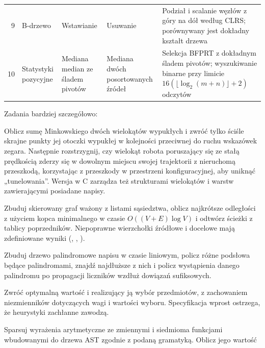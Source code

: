 \begin{table}[htbp]
\begin{tabularx}{\textwidth}{@{}rL{2.7cm}L{3.0cm}L{3.0cm}Y@{}}
    9  & B-drzewo                   & Wstawianie & Usuwanie & Podział i scalanie węzłów z góry na dół według CLRS; porównywany jest dokładny kształt drzewa~\cite{bayer1972btree,cormen2009clrs} \\
    10 & Statystyki pozycyjne       & Mediana median ze śladem pivotów & Mediana dwóch posortowanych źródeł & Selekcja BFPRT z dokładnym śladem pivotów; wyszukiwanie binarne przy limicie $16(\lfloor\log_2(m{+}n)\rfloor+2)$ odczytów~\cite{blum1973time} \\
    \bottomrule
  \end{tabularx}
\end{table}

\noindent Zadania bardziej szczegółowo:

\begin{description}[leftmargin=0pt,itemsep=3pt,font=\normalfont\bfseries]
  \item[Zadanie 1: logika przestrzenna.] Oblicz sumę Minkowskiego dwóch wielokątów wypukłych i zwróć
    tylko ściśle skrajne punkty jej otoczki wypukłej w kolejności przeciwnej do ruchu wskazówek
    zegara. Następnie rozstrzygnij, czy wielokąt robota poruszający się ze stałą prędkością zderzy
    się w dowolnym miejscu swojej trajektorii z nieruchomą przeszkodą, korzystając z przeszkody
    w przestrzeni konfiguracyjnej, aby uniknąć „tunelowania”. Wersja w C zarządza też strukturami
    wielokątów i warstw zawierającymi posiadane napisy.
  \item[Zadanie 2: Dijkstra.] Zbuduj skierowany graf ważony z listami sąsiedztwa, oblicz najkrótsze
    odległości z użyciem kopca minimalnego w czasie $O((V+E)\log V)$ i odtwórz ścieżki z tablicy
    poprzedników. Niepoprawne wierzchołki źródłowe i docelowe mają zdefiniowane wyniki
    (, , ).
  \item[Zadanie 3: eertree.] Zbuduj drzewo palindromowe napisu w czasie liniowym, policz różne
    podsłowa będące palindromami, znajdź najdłuższe z nich i policz wystąpienia danego palindromu
    po propagacji liczników wzdłuż dowiązań sufiksowych.
  \item[Zadanie 4: plecak 0/1.] Zwróć optymalną wartość i realizujący ją wybór przedmiotów,
    z zachowaniem niezmienników dotyczących wagi i wartości wyboru. Specyfikacja wprost ostrzega,
    że heurystyki zachłanne zawodzą.
  \item[Zadanie 5: parser wyrażeń.] Sparsuj wyrażenia arytmetyczne ze zmiennymi i siedmioma
    funkcjami wbudowanymi do drzewa AST zgodnie z podaną gramatyką. Oblicz jego wartość

\end{description}
